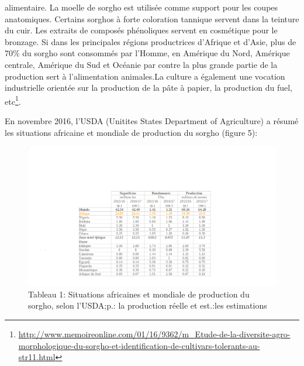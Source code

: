 \documentclass[a4paper,11pt]{article}
\begin{document}
alimentaire. La moelle de sorgho est utilisée comme support pour les
coupes anatomiques. Certains sorghos à forte coloration tannique
servent dans la teinture du cuir. Les extraits de composés phénoliques
servent en cosmétique pour le bronzage. Si dans les principales
régions productrices d’Afrique et d’Asie, plus de 70\% du sorgho sont
consommés par l’Homme, en Amérique du Nord, Amérique centrale,
Amérique du Sud et Océanie par contre la plus grande partie de la
production sert à l’alimentation animales\cite{BARRO_KONDOMBO_2010}.La
culture a également une vocation industrielle orientée sur la
production de la pâte à papier, la production du fuel,
etc\footnote{\url{http://www.memoireonline.com/01/16/9362/m_Etude-de-la-diversite-agro-morphologique-du-sorgho-et-identification-de-cultivars-tolerants-au-str11.html}}.

En novembre 2016, l’USDA (Unitites States Department of Agriculture) a résumé les situations africaine et mondiale de production du sorgho (figure 5):


\begin{figure}%
  \begin{center}
   \includegraphics[width=14cm]{images/WorldSorghumStatisticsUsda}
  \end{center}
  \caption{Tableau 1: Situations africaines et mondiale de production du sorgho, selon l’USDA;p.:
    la production réelle et est.:les estimations}
\end{figure}



\end{document}
